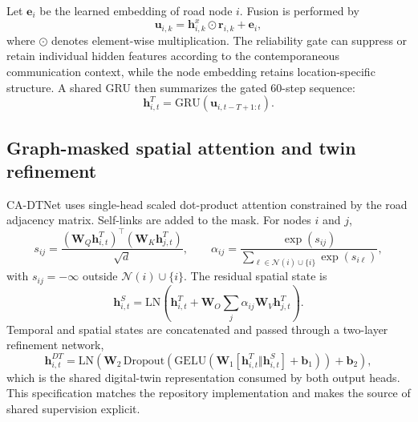 \documentclass[pdflatex,sn-mathphys-num]{sn-jnl}%
\newenvironment{changed}{\color{blue}}{}
\theoremstyle{thmstyleone}%
\theoremstyle{thmstyletwo}%
\theoremstyle{thmstylethree}%
\begin{document}
\begin{changed}
Let \(\mathbf{e}_i\) be the learned embedding of road node \(i\). Fusion is performed by
\begin{equation}
\mathbf{u}_{i,k}=\mathbf{h}^{x}_{i,k}\odot\mathbf{r}_{i,k}+\mathbf{e}_{i},
\end{equation}
where \(\odot\) denotes element-wise multiplication. The reliability gate can suppress or retain individual hidden features according to the contemporaneous communication context, while the node embedding retains location-specific structure. A shared GRU then summarizes the gated 60-step sequence:
\begin{equation}
\mathbf{h}^{T}_{i,t}=\mathrm{GRU}\!\left(\mathbf{u}_{i,t-T+1:t}\right).
\end{equation}

\subsection{Graph-masked spatial attention and twin refinement}
\label{subsec:graph_attention_encoder}

CA-DTNet uses single-head scaled dot-product attention constrained by the road adjacency matrix. Self-links are added to the mask. For nodes \(i\) and \(j\),
\begin{equation}
s_{ij}=\frac{(\mathbf{W}_{Q}\mathbf{h}^{T}_{i,t})^{\top}(\mathbf{W}_{K}\mathbf{h}^{T}_{j,t})}{\sqrt{d}},
\qquad
\alpha_{ij}=\frac{\exp(s_{ij})}{\sum_{\ell\in\mathcal{N}(i)\cup\{i\}}\exp(s_{i\ell})},
\end{equation}
with \(s_{ij}=-\infty\) outside \(\mathcal{N}(i)\cup\{i\}\). The residual spatial state is
\begin{equation}
\mathbf{h}^{S}_{i,t}=\mathrm{LN}\!\left(\mathbf{h}^{T}_{i,t}+\mathbf{W}_{O}\sum_{j}\alpha_{ij}\mathbf{W}_{V}\mathbf{h}^{T}_{j,t}\right).
\end{equation}
Temporal and spatial states are concatenated and passed through a two-layer refinement network,
\begin{equation}
\mathbf{h}^{DT}_{i,t}=\mathrm{LN}\!\left(\mathbf{W}_{2}\,\mathrm{Dropout}\!\left(\mathrm{GELU}\!\left(\mathbf{W}_{1}[\mathbf{h}^{T}_{i,t}\Vert\mathbf{h}^{S}_{i,t}]+\mathbf{b}_{1}\right)\right)+\mathbf{b}_{2}\right),
\end{equation}
which is the shared digital-twin representation consumed by both output heads. This specification matches the repository implementation and makes the source of shared supervision explicit.
\end{changed}
\end{document}
